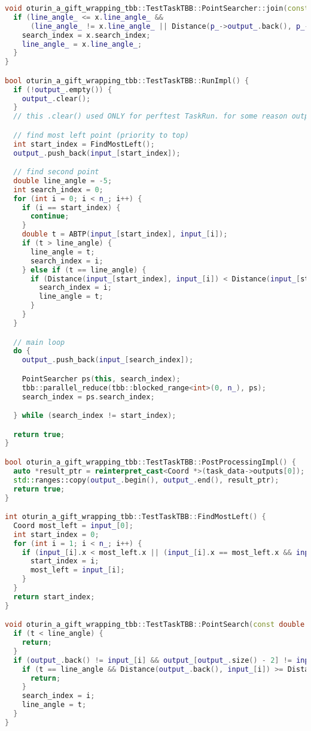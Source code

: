 \documentclass[12pt,a4paper]{extarticle}
\begin{document}
\begin{lstlisting}[language=C++]
void oturin_a_gift_wrapping_tbb::TestTaskTBB::PointSearcher::join(const PointSearcher &x) {
  if (line_angle_ <= x.line_angle_ &&
      (line_angle_ != x.line_angle_ || Distance(p_->output_.back(), p_->input_[x.search_index]) < Distance(p_->output_.back(), p_->input_[search_index]))) {
    search_index = x.search_index;
    line_angle_ = x.line_angle_;
  }
}

bool oturin_a_gift_wrapping_tbb::TestTaskTBB::RunImpl() {
  if (!output_.empty()) {
    output_.clear();
  }
  // this .clear() used ONLY for perftest TaskRun. for some reason output_ has something in it

  // find most left point (priority to top)
  int start_index = FindMostLeft();
  output_.push_back(input_[start_index]);

  // find second point
  double line_angle = -5;
  int search_index = 0;
  for (int i = 0; i < n_; i++) {
    if (i == start_index) {
      continue;
    }
    double t = ABTP(input_[start_index], input_[i]);
    if (t > line_angle) {
      line_angle = t;
      search_index = i;
    } else if (t == line_angle) {
      if (Distance(input_[start_index], input_[i]) < Distance(input_[start_index], input_[search_index])) {
        search_index = i;
        line_angle = t;
      }
    }
  }

  // main loop
  do {
    output_.push_back(input_[search_index]);

    PointSearcher ps(this, search_index);
    tbb::parallel_reduce(tbb::blocked_range<int>(0, n_), ps);
    search_index = ps.search_index;

  } while (search_index != start_index);

  return true;
}

bool oturin_a_gift_wrapping_tbb::TestTaskTBB::PostProcessingImpl() {
  auto *result_ptr = reinterpret_cast<Coord *>(task_data->outputs[0]);
  std::ranges::copy(output_.begin(), output_.end(), result_ptr);
  return true;
}

int oturin_a_gift_wrapping_tbb::TestTaskTBB::FindMostLeft() {
  Coord most_left = input_[0];
  int start_index = 0;
  for (int i = 1; i < n_; i++) {
    if (input_[i].x < most_left.x || (input_[i].x == most_left.x && input_[i].y > most_left.y)) {
      start_index = i;
      most_left = input_[i];
    }
  }
  return start_index;
}

void oturin_a_gift_wrapping_tbb::TestTaskTBB::PointSearch(const double t, double &line_angle, int &search_index, const int i) {
  if (t < line_angle) {
    return;
  }
  if (output_.back() != input_[i] && output_[output_.size() - 2] != input_[i]) {
    if (t == line_angle && Distance(output_.back(), input_[i]) >= Distance(output_.back(), input_[search_index])) {
      return;
    }
    search_index = i;
    line_angle = t;
  }
}
\end{lstlisting}
\end{document}
